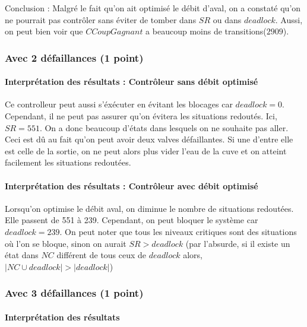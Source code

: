 \documentclass[a4paper]{book}
\begin{document}
Conclusion : Malgré le fait qu'on ait optimisé le débit d'aval, on a constaté qu'on ne pourrait pas contrôler sans éviter de tomber dans $SR$ ou dans $deadlock$.
Aussi, on peut bien voir que $CCoupGagnant$ a beaucoup moins de transitions($2909$).

\subsubsection{Avec 2 défaillances (1 point)}


%
%
%
\paragraph{Interprétation des résultats : Contrôleur sans débit optimisé}
Ce controlleur peut aussi s'éxécuter en évitant les blocages car $deadlock = 0$. Cependant, il ne peut pas assurer qu'on évitera les situations redoutés.
Ici, $SR = 551$. On a donc beaucoup d'états dans lesquels on ne souhaite pas aller. Ceci est dû au fait qu'on peut avoir deux valves défaillantes.
Si une d'entre elle est celle de la sortie, on ne peut alors plus vider l'eau de la cuve et on atteint facilement les situations redoutées.

\paragraph{Interprétation des résultats : Contrôleur avec débit optimisé}

Lorsqu'on optimise le débit aval, on diminue le nombre de situations redoutées. Elle passent de 551 à 239. Cependant, on peut bloquer le système
car $deadlock = 239$. On peut noter que tous les niveaux critiques sont des situations où l'on se bloque, sinon on aurait $SR > deadlock$ (par l'absurde, si il existe un état dans $NC$ différent de tous ceux de $deadlock$ alors, $|NC \cup deadlock| > |deadlock|$)


\subsubsection{Avec 3 défaillances (1 point)}


%
%
%
\paragraph{Interprétation des résultats}
\end{document}
